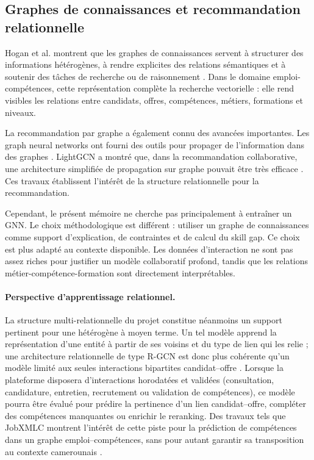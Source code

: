 \subsection{Graphes de connaissances et recommandation relationnelle}

Hogan et al. montrent que les graphes de connaissances servent à structurer des informations hétérogènes, à rendre explicites des relations sémantiques et à soutenir des tâches de recherche ou de raisonnement \cite{hogan2021knowledge}. Dans le domaine emploi-compétences, cette représentation complète la recherche vectorielle : elle rend visibles les relations entre candidats, offres, compétences, métiers, formations et niveaux.

La recommandation par graphe a également connu des avancées importantes. Les graph neural networks ont fourni des outils pour propager de l'information dans des graphes \cite{kipf2017gcn,velickovic2018gat}. LightGCN a montré que, dans la recommandation collaborative, une architecture simplifiée de propagation sur graphe pouvait être très efficace \cite{he2020lightgcn}. Ces travaux établissent l'intérêt de la structure relationnelle pour la recommandation.

Cependant, le présent mémoire ne cherche pas principalement à entraîner un GNN. Le choix méthodologique est différent : utiliser un graphe de connaissances comme support d'explication, de contraintes et de calcul du skill gap. Ce choix est plus adapté au contexte disponible. Les données d'interaction ne sont pas assez riches pour justifier un modèle collaboratif profond, tandis que les relations métier-compétence-formation sont directement interprétables.

\paragraph{Perspective d'apprentissage relationnel.}
La structure multi-relationnelle du projet constitue néanmoins un support pertinent pour une \GNN{} hétérogène à moyen terme. Un tel modèle apprend la représentation d'une entité à partir de ses voisins et du type de lien qui les relie ; une architecture relationnelle de type R-GCN est donc plus cohérente qu'un modèle limité aux seules interactions bipartites candidat--offre \cite{schlichtkrull2018rgcn}. Lorsque la plateforme disposera d'interactions horodatées et validées (consultation, candidature, entretien, recrutement ou validation de compétences), ce modèle pourra être évalué pour prédire la pertinence d'un lien candidat--offre, compléter des compétences manquantes ou enrichir le reranking. Des travaux tels que JobXMLC montrent l'intérêt de cette piste pour la prédiction de compétences dans un graphe emploi--compétences, sans pour autant garantir sa transposition au contexte camerounais \cite{goyal2023jobxmlc}.

